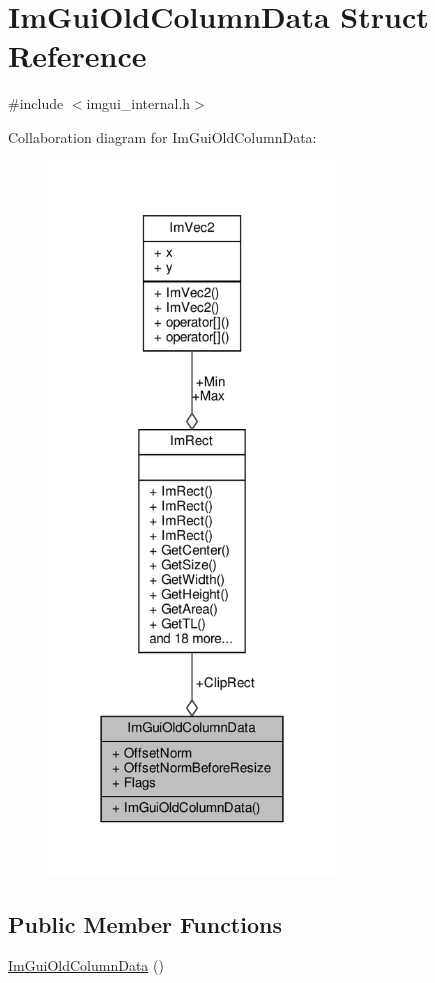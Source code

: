 \hypertarget{structImGuiOldColumnData}{}\section{Im\+Gui\+Old\+Column\+Data Struct Reference}
\label{structImGuiOldColumnData}


{\ttfamily \#include $<$imgui\+\_\+internal.\+h$>$}



Collaboration diagram for Im\+Gui\+Old\+Column\+Data\+:
\nopagebreak
\begin{figure}[H]
\begin{center}
\leavevmode
\includegraphics[width=216pt]{structImGuiOldColumnData__coll__graph}
\end{center}
\end{figure}
\subsection*{Public Member Functions}
\begin{DoxyCompactItemize}
\item 
\hyperlink{structImGuiOldColumnData_a6fd70ab5181a2615ac83ffb7813b31e3}{Im\+Gui\+Old\+Column\+Data} ()
\end{DoxyCompactItemize}
